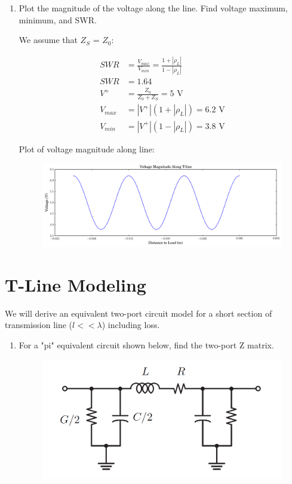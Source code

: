 \documentclass[11pt]{article}
\begin{document}
\begin{enumerate}
	\item Plot the magnitude of the voltage along the line. Find voltage maximum, minimum, and SWR.
	
	We assume that $Z_S$ = $Z_0$:
	
	\begin{align*}
		SWR &= \frac{V_{max}}{V_{min}} = \frac{1 + |\rho_L|}{1 - |\rho_L|} \\
		SWR &= 1.64 \\
		V^+ &= \frac{Z_0}{Z_0 + Z_S} = 5 \text{ V} \\
		V_{max} &= |V^+| (1 + |\rho_L|) = 6.2 \text{ V} \\
		V_{min} &= |V^+| (1 - |\rho_L|) = 3.8 \text{ V} 
	\end{align*}
	
	Plot of voltage magnitude along line:
	\begin{figure}[H]
		\centering \includegraphics[width=\textwidth]{images/problem1.png}
	\end{figure}
\end{enumerate}

\section{T-Line Modeling}
We will derive an equivalent two-port circuit model for a short section of transmission line ($l << \lambda$) including loss.

\begin{enumerate}
	\item For a "pi" equivalent circuit shown below, find the two-port Z matrix.
	\begin{figure}[H]
		\centering \includegraphics[width=\textwidth-6cm]{images/problem2_pi_network.png}
	\end{figure}
	
\end{enumerate}
\end{document}
